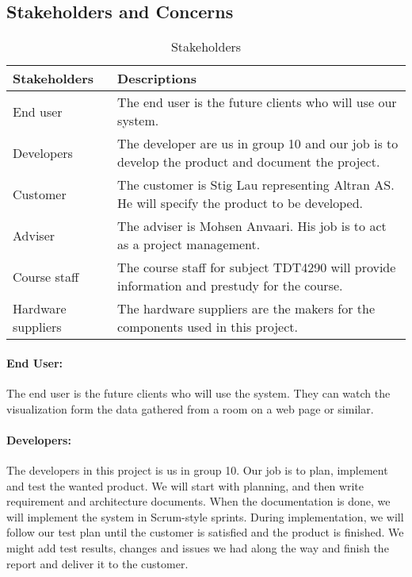 \documentclass[../document.tex]{subfiles}
\begin{document}
\subsection{Stakeholders and Concerns}
\begin{table}[H]
	\caption{Stakeholders}
	\begin{tabularx}{\textwidth}{|X|X|}
		\hline
		\textbf{Stakeholders}	& \textbf{Descriptions} \\ \hline
		End user				& The end user is the future clients who will use our system.  \\ \hline
		Developers				& The developer are us in group 10 and our job is to develop the product and document the project.  \\ \hline
		Customer				& The customer is Stig Lau representing Altran AS. He will specify the product to be developed.  \\ \hline
		Adviser					& The adviser is Mohsen Anvaari. His job is to act as a project management.  \\ \hline
		Course staff			& The course staff for subject TDT4290 will provide information and prestudy for the course.  \\ \hline
		Hardware suppliers		& The hardware suppliers are the makers for the components used in this project.  \\ \hline
	\end{tabularx}
\end{table}

\paragraph{End User:} The end user is the future clients who will use the system. They can watch the visualization form the data gathered from a room on a web page or similar. 

\paragraph{Developers:} The developers in this project is us in group 10. Our job is to plan, implement and test the wanted product. We will start with planning, and then write requirement and architecture documents. When the documentation is done, we will implement the system in Scrum-style sprints. During implementation, we will follow our test plan until the customer is satisfied and the product is finished. We might add test results, changes and issues we had along the way and finish the report and deliver it to the customer.
\end{document}

